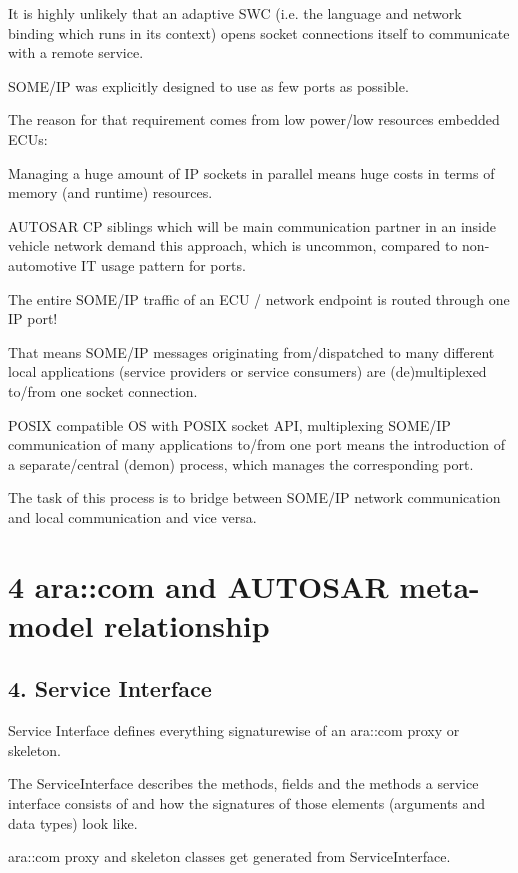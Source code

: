 \begin{DoxyItemize}
\item It is highly unlikely that an adaptive S\+WC (i.\+e. the language and network binding which runs in its context) opens socket connections itself to communicate with a remote service.
\item S\+O\+M\+E/\+IP was explicitly designed to use as few ports as possible.
\item The reason for that requirement comes from low power/low resources embedded E\+C\+Us\+:
\item Managing a huge amount of IP sockets in parallel means huge costs in terms of memory (and runtime) resources.
\item A\+U\+T\+O\+S\+AR CP siblings which will be main communication partner in an inside vehicle network demand this approach, which is uncommon, compared to non-\/automotive IT usage pattern for ports.
\item The entire S\+O\+M\+E/\+IP traffic of an E\+CU / network endpoint is routed through one IP port!
\item That means S\+O\+M\+E/\+IP messages originating from/dispatched to many different local applications (service providers or service consumers) are (de)multiplexed to/from one socket connection.
\item P\+O\+S\+IX compatible OS with P\+O\+S\+IX socket A\+PI, multiplexing S\+O\+M\+E/\+IP communication of many applications to/from one port means the introduction of a separate/central (demon) process, which manages the corresponding port.
\item The task of this process is to bridge between S\+O\+M\+E/\+IP network communication and local communication and vice versa. 
\end{DoxyItemize}

\section*{4 ara\+::com and A\+U\+T\+O\+S\+AR meta-\/model relationship}

\subsection*{4. Service Interface}


\begin{DoxyItemize}
\item Service Interface defines everything signaturewise of an ara\+::com proxy or skeleton.
\item The Service\+Interface describes the methods, fields and the methods a service interface consists of and how the signatures of those elements (arguments and data types) look like.
\item ara\+::com proxy and skeleton classes get generated from Service\+Interface.
\end{DoxyItemize}

